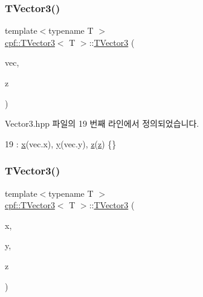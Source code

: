 \subsubsection{\texorpdfstring{T\+Vector3()}{TVector3()}\hspace{0.1cm}{\footnotesize\ttfamily [2/3]}}
{\footnotesize\ttfamily template$<$typename T $>$ \\
\hyperlink{classcpf_1_1_t_vector3}{cpf\+::\+T\+Vector3}$<$ T $>$\+::\hyperlink{classcpf_1_1_t_vector3}{T\+Vector3} (\begin{DoxyParamCaption}\item[{\hyperlink{classcpf_1_1_t_vector2}{T\+Vector2}$<$ T $>$}]{vec,  }\item[{T}]{z }\end{DoxyParamCaption})\hspace{0.3cm}{\ttfamily [inline]}}



Vector3.\+hpp 파일의 19 번째 라인에서 정의되었습니다.


\begin{DoxyCode}
19 : \hyperlink{classcpf_1_1_t_vector3_ad3df42808358a64c518d6349ede446d8}{x}(vec.x), \hyperlink{classcpf_1_1_t_vector3_a2371a0583e76dcc80c6f10dd168cde1b}{y}(vec.y), \hyperlink{classcpf_1_1_t_vector3_ae7ea5f4b24c3438a44eb6b0fdfe02823}{z}(\hyperlink{classcpf_1_1_t_vector3_ae7ea5f4b24c3438a44eb6b0fdfe02823}{z}) \{\}
\end{DoxyCode}
\mbox{\label{classcpf_1_1_t_vector3_a26f5c99ef0caf8794709b5df049cd660}} 
\subsubsection{\texorpdfstring{T\+Vector3()}{TVector3()}\hspace{0.1cm}{\footnotesize\ttfamily [3/3]}}
{\footnotesize\ttfamily template$<$typename T $>$ \\
\hyperlink{classcpf_1_1_t_vector3}{cpf\+::\+T\+Vector3}$<$ T $>$\+::\hyperlink{classcpf_1_1_t_vector3}{T\+Vector3} (\begin{DoxyParamCaption}\item[{T}]{x,  }\item[{T}]{y,  }\item[{T}]{z }\end{DoxyParamCaption})\hspace{0.3cm}{\ttfamily [inline]}}



